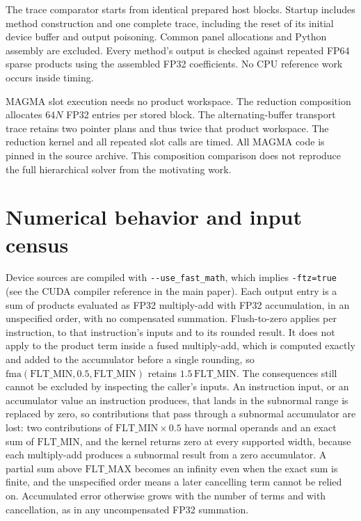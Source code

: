 \documentclass[10pt]{article}
\begin{document}
The trace comparator starts from identical prepared host blocks. Startup
includes method construction and one complete trace, including the reset
of its initial device buffer and output poisoning. Common panel allocations and Python assembly
are excluded. Every method's output is checked against repeated
FP64 sparse products using the assembled FP32 coefficients. No CPU reference
work occurs inside timing.

MAGMA slot execution needs no product workspace. The reduction composition
allocates \(64N\) FP32 entries per stored block. The alternating-buffer
transport trace retains two pointer plans and thus twice that product
workspace. The reduction kernel and all repeated slot calls are timed.
All MAGMA code is pinned in the source archive. This composition comparison
does not reproduce the full hierarchical solver from the motivating work.

\begin{table}[H]
\centering\small
\caption{Controlled combinations. Best-library-to-direct ratios average
three paired process ratios. Fixed-size 32 cases include BSR32.}

\end{table}


\FloatBarrier
\section{Numerical behavior and input census}
Device sources are compiled with \texttt{-{}-use\_fast\_math}, which implies
\texttt{-ftz=true} (see the CUDA compiler reference in the main paper). Each output entry is a sum of products evaluated as
FP32 multiply-add with FP32 accumulation, in an unspecified order, with no
compensated summation. Flush-to-zero applies per instruction, to that
instruction's inputs and to its rounded result. It does not apply to the
product term inside a fused multiply-add, which is computed exactly and added
to the accumulator before a single rounding, so
\(\mathrm{fma}(\mathrm{FLT\_MIN},0.5,\mathrm{FLT\_MIN})\) retains
\(1.5\,\mathrm{FLT\_MIN}\). The consequences still cannot be excluded by
inspecting the caller's inputs. An instruction input, or an accumulator value
an instruction produces, that lands in the subnormal range is replaced by zero,
so contributions that pass through a subnormal accumulator are lost: two
contributions of \(\mathrm{FLT\_MIN}\times 0.5\) have normal operands and an
exact sum of \(\mathrm{FLT\_MIN}\), and the kernel returns zero at every
supported width, because each multiply-add produces a subnormal result from a
zero accumulator.
A partial sum above \(\mathrm{FLT\_MAX}\) becomes an infinity even when the
exact sum is finite, and the unspecified order means a later cancelling term
cannot be relied on. Accumulated error otherwise grows with the number of
terms and with cancellation, as in any uncompensated FP32 summation.
\end{document}
